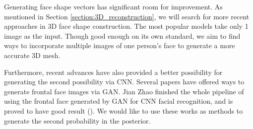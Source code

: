 \documentclass{article}
\begin{document}
Generating face shape vectors has significant room for improvement. As mentioned
in Section \ref{section:3D_reconstruction}, we will search for more recent
approaches in 3D face shape construction. The most popular models take only 1
image as the input. Though good enough on its own standard, we aim to find ways
to incorporate multiple images of one person's face to generate a more accurate
3D mesh.

Furthermore, recent advances have also provided a better possibility for
generating the second possibility via CNN. Several papers have offered ways to
generate frontal face images via GAN. Jian Zhao finished the whole pipeline of
using the frontal face generated by GAN for CNN facial recognition, and is
proved to have good result (\cite{Zhao2018CVPR}). We would like to use these
works as methods to generate the second probability in the posterior.

\newpage


\end{document}
